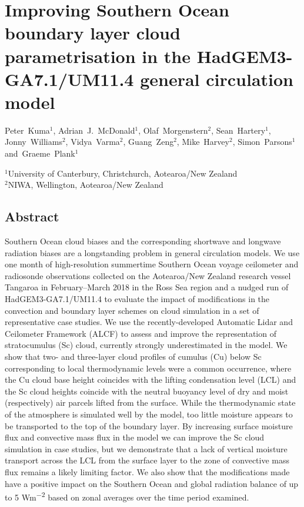 \chapter{Improving Southern Ocean boundary layer cloud para\-metrisation in the HadGEM3-GA7.1/UM11.4 general circulation model}

\vspace{-0.1cm}\begin{spacing}{1.2}\sffamily\raggedright
Peter~Kuma$^1$, Adrian~J.~McDonald$^1$, Olaf~Morgenstern$^2$, Sean~Hartery$^1$, Jonny~Williams$^2$, Vidya~Varma$^2$, Guang~Zeng$^2$, Mike~Harvey$^2$, Simon~Parsons$^1$ and~Graeme~Plank$^1$
\end{spacing}

\vspace{0.4cm}\begin{spacing}{1.2}\footnotesize\sffamily\noindent\raggedright
$^1$University of Canterbury, Christchurch, Aotearoa/New Zealand\\
$^2$NIWA, Wellington, Aotearoa/New Zealand
\end{spacing}

\section*{Abstract}

Southern Ocean cloud biases and the corresponding shortwave and longwave radiation
biases are a longstanding problem in general circulation models. We use one month of high-resolution summertime
Southern Ocean voyage ceilometer and radiosonde observations collected on the Aotearoa/New Zealand research vessel Tangaroa in February--March
2018 in the Ross Sea region
and a nudged run of HadGEM3-GA7.1/UM11.4 to
evaluate the impact of modifications in the convection and boundary layer
schemes on cloud simulation in a set of representative case studies. We use the recently-developed Automatic Lidar and Ceilometer Framework (ALCF) to assess and improve the representation of stratocumulus (Sc) cloud,
currently strongly underestimated in the model. We show that two- and three-layer cloud
profiles of cumulus (Cu) below Sc corresponding to local thermodynamic levels were a common occurrence, where
the Cu cloud base height coincides with the lifting condensation level (LCL)
and the Sc cloud heights coincide with the neutral buoyancy level of dry and moist (respectively) air
parcels lifted from the surface.
While the thermodynamic state of the atmosphere is simulated
well by the model, too little moisture appears to be transported to the top of the boundary layer. By increasing surface moisture flux and convective mass flux in the model we can improve the Sc cloud simulation in case studies, but we demonstrate that a lack of vertical moisture transport
across the LCL from the surface layer to the zone of convective mass flux remains a likely limiting factor.
We also show that the modifications made have a positive impact on the Southern Ocean and
global radiation balance of up to 5 \unit{Wm^{-2}} based on zonal averages over the time period examined.

